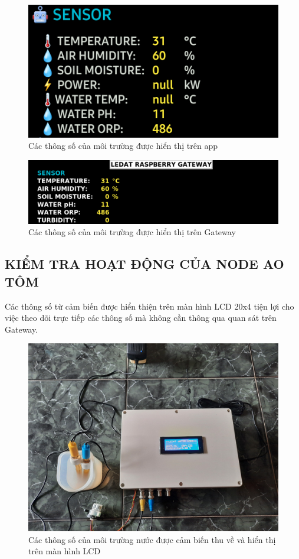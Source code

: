 \begin{figure}[H]
	\centering
	\includegraphics[scale=0.4]{Chapter 4/image chapter 4/appMT.png}
	\caption[Các thông số của môi trường được hiển thị trên app]{Các thông số của môi trường được hiển thị trên app}
	\label{hinh43}
\end{figure}
\begin{figure}[H]
	\centering
	\includegraphics[scale=0.4]{Chapter 4/image chapter 4/gwMT.png}
	\caption[Các thông số của môi trường được hiển thị trên Gateway]{Các thông số của môi trường được hiển thị trên Gateway}
	\label{hinh44}
\end{figure}
\subsection{KIỂM TRA HOẠT ĐỘNG CỦA NODE AO TÔM}
\indent Các thông số từ cảm biến được hiển thiện trên màn hình LCD 20x4 tiện lợi cho việc theo dõi trực tiếp các thông số mà không cần thông qua quan sát trên Gateway.
\begin{figure}[H]
	\centering
	\includegraphics[scale=0.1]{Chapter 4/image chapter 4/aotomNode.jpg}
	\caption[Các thông số của môi trường nước được cảm biến thu về và hiển thị trên màn hình LCD]{Các thông số của môi trường nước được cảm biến thu về và hiển thị trên màn hình LCD}
\end{figure}
